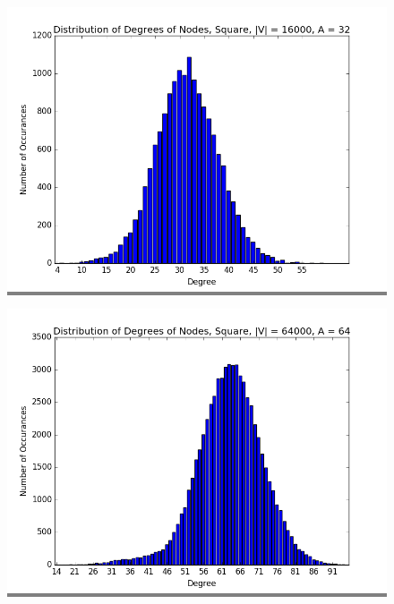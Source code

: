 \documentclass{article}
\begin{document}
\begin{figure}
\begin{minipage}{0.3\textwidth}
    \colorbox{gray}{\includegraphics[width=\linewidth]{./graphs/hist_deg_square_2.png}}
    \end{minipage}
    \vskip 0.1in
    \begin{minipage}{0.3\textwidth}
    \colorbox{gray}{\includegraphics[width=\linewidth]{./graphs/hist_deg_square_3.png}}
    \end{minipage}
    \hspace{\fill}
    \begin{minipage}{0.3\textwidth}

\end{minipage}
\end{figure}
\end{document}
